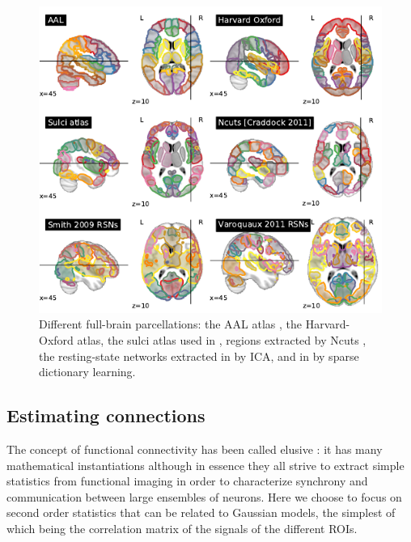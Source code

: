 \documentclass[5p]{elsarticle}
\begin{document}
\begin{figure}
\includegraphics[width=\linewidth]{pg_0001}%

\caption{
Different full-brain parcellations: the AAL atlas
\cite{tzourio-mazoyer2002a}, the Harvard-Oxford atlas, the sulci atlas used in
\cite{varoquaux2010c}, regions extracted by Ncuts
\cite{craddock2012}, the resting-state networks extracted in
\cite{smith2009} by ICA, and in \cite{varoquaux2011} by sparse dictionary
learning.
\label{fig:parcellations}
}
\end{figure}

\subsection{Estimating connections}

The concept of functional connectivity has been called elusive
\cite{horwitz2003}: it has many mathematical instantiations although in
essence they all strive to extract simple statistics from functional
imaging in order to characterize synchrony and communication between large
ensembles of neurons. Here we choose to focus on second order statistics
that can be related to Gaussian models, the simplest of which being the
correlation matrix of the signals of the different ROIs.
\end{document}
